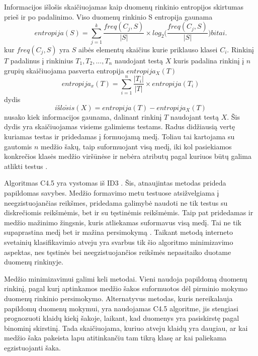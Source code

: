  Informacijos išlošis skaičiuojamas kaip duomenų rinkinio entropijos skirtumas prieš ir po padalinimo. Viso duomenų rinkinio S entropija gaunama \cite{c45}
\begin{equation}\label{eq:entropija}
entropija(S) = \sum_{j=1}^{k} \frac{freq(C_j, S)}{|S|} \times log_2\Big(\frac{freq(C_j, S)}{|S|}\Big)  bitai.
\end{equation}
kur $freq(C_j, S)$ yra $S$ aibės elementų skaičius kurie priklauso klasei $C_i$. Rinkinį $T$ padalinus į rinkinius $T_1, T_2, ... , T_n$ naudojant testą $X$ kuris padalina rinkinį į $n$ grupių skaičiuojama pasverta entropija $entropija_X(T)$ \cite{c45}
\begin{equation}\label{eq:entropija_x}
entropija_x(T) = \sum_{i=1}^{n} \frac{|T_i|}{|T|} \times entropija(T_i)
\end{equation}
dydis
\begin{equation}\label{eq:išlošis}
    išlo \check sis(X) = entropija(T) - entropija_X(T)
\end{equation}
nusako kiek informacijos gaunama, dalinant rinkinį $T$ naudojant testą $X$. Šis dydis yra skaičiuojamas visiems galimiems testams. Radus didžiausią vertę kuriamas testas ir pridedamas į formuojamą medį. Toliau tai kartojama su gautomis $n$ medžio šakų, taip suformuojant visą medį, iki kol pasiekiamos konkrečios klasės medžio viršūnėse ir nebėra atributų pagal kuriuos būtų galima atlikti testus \cite{c45}.

Algoritmas C4.5 yra vystomas iš ID3 \cite{Wu2008}. Šis, atnaujintas metodas prideda papildomas savybes. Medžio formavimo metu testuose atsižvelgiama į neegzistuojančias reikšmes, pridedama galimybė naudoti ne tik testus su diskrečiomis reikšmėmis, bet ir su tęstinėmis reikšmėmis. Taip pat pridedamas ir medžio mažinimo žingsnis, kuris atliekamas suformavus visą medį. Tai ne tik supaprastina medį bet ir mažina persimokymą \cite{c45}. Taikant metodą interneto svetainių klasifikavimio atveju yra svarbus tik šio algoritmo minimizavimo aspektas, nes tęstinės bei neegzistuojančios reikšmės nepasitaiko duotame duomenų rinkinyje.

Medžio minimizavimui galimi keli metodai. Vieni naudoja papildomą duomenų rinkinį, pagal kurį aptinkamos medžio šakos suformuotos dėl pirminio mokymo duomenų rinkinio persimokymo. Alternatyvus metodas, kuris nereikalauja papildomų duomenų mokymui, yra naudojamas C4.5 algoritme, jis stengiasi prognozuoti klaidų kiekį šakoje, laikant, kad duomenys yra pasiskirstę pagal binominį skirstinį. Tada skaičiuojama, kuriuo atveju klaidų yra daugiau, ar kai medžio šaka pakeista lapu atitinkančiu tam tikrą klasę ar kai paliekama egzistuojanti šaka.

